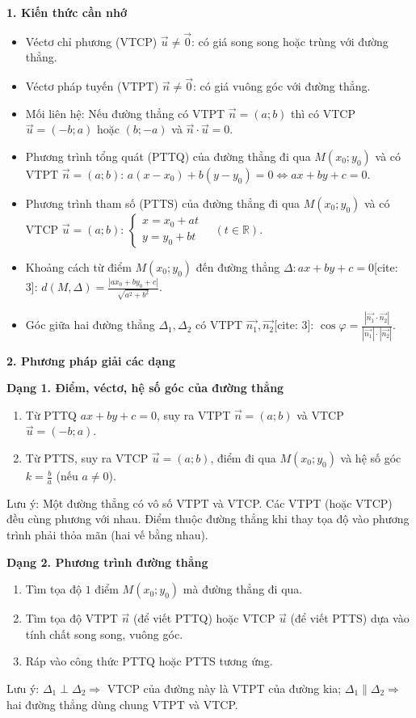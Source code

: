 \textbf{1. Kiến thức cần nhớ}
\begin{itemize}
\item Véctơ chỉ phương (VTCP) $\overrightarrow{u} \neq \overrightarrow{0}$: có giá song song hoặc trùng với đường thẳng.
\item Véctơ pháp tuyến (VTPT) $\overrightarrow{n} \neq \overrightarrow{0}$: có giá vuông góc với đường thẳng.
\item Mối liên hệ: Nếu đường thẳng có VTPT $\overrightarrow{n} = (a; b)$ thì có VTCP $\overrightarrow{u} = (-b; a)$ hoặc $(b; -a)$ và $\overrightarrow{n} \cdot \overrightarrow{u} = 0$.
\item Phương trình tổng quát (PTTQ) của đường thẳng đi qua $M(x_0; y_0)$ và có VTPT $\overrightarrow{n} = (a; b)$:
  $\boxed{a(x-x_0) + b(y-y_0) = 0} \Leftrightarrow ax + by + c = 0$.
\item Phương trình tham số (PTTS) của đường thẳng đi qua $M(x_0; y_0)$ và có VTCP $\overrightarrow{u} = (a; b)$:
  $\boxed{\begin{cases} x = x_0 + at \\ y = y_0 + bt \end{cases}} \quad (t \in \mathbb{R})$.
\item Khoảng cách từ điểm $M(x_0; y_0)$ đến đường thẳng $\Delta: ax+by+c=0$[cite: 3]:
  $\boxed{d(M, \Delta) = \frac{|ax_0+by_0+c|}{\sqrt{a^2+b^2}}}$.
\item Góc giữa hai đường thẳng $\Delta_1, \Delta_2$ có VTPT $\overrightarrow{n_1}, \overrightarrow{n_2}$[cite: 3]:
  $\cos \varphi = \frac{|\overrightarrow{n_1} \cdot \overrightarrow{n_2}|}{|\overrightarrow{n_1}| \cdot |\overrightarrow{n_2}|}$.
\end{itemize}

\textbf{2. Phương pháp giải các dạng}

\textbf{Dạng 1. Điểm, véctơ, hệ số góc của đường thẳng}
\begin{enumerate}
\item Từ PTTQ $ax+by+c=0$, suy ra VTPT $\overrightarrow{n}=(a;b)$ và VTCP $\overrightarrow{u}=(-b;a)$.
\item Từ PTTS, suy ra VTCP $\overrightarrow{u}=(a;b)$, điểm đi qua $M(x_0; y_0)$ và hệ số góc $k = \frac{b}{a}$ (nếu $a \neq 0$).
\end{enumerate}
Lưu ý: Một đường thẳng có vô số VTPT và VTCP. Các VTPT (hoặc VTCP) đều cùng phương với nhau. Điểm thuộc đường thẳng khi thay tọa độ vào phương trình phải thỏa mãn (hai vế bằng nhau).

\textbf{Dạng 2. Phương trình đường thẳng}
\begin{enumerate}
\item Tìm tọa độ $1$ điểm $M(x_0; y_0)$ mà đường thẳng đi qua.
\item Tìm tọa độ VTPT $\overrightarrow{n}$ (để viết PTTQ) hoặc VTCP $\overrightarrow{u}$ (để viết PTTS) dựa vào tính chất song song, vuông góc.
\item Ráp vào công thức PTTQ hoặc PTTS tương ứng.
\end{enumerate}
Lưu ý: $\Delta_1 \perp \Delta_2 \Rightarrow$ VTCP của đường này là VTPT của đường kia; $\Delta_1 \parallel \Delta_2 \Rightarrow$ hai đường thẳng dùng chung VTPT và VTCP.


